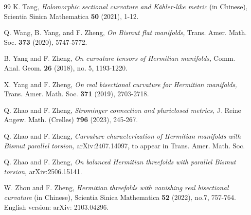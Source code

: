 \documentclass{amsart}
\begin{document}
\begin{thebibliography}{99}
  K. Tang, \emph{Holomorphic sectional curvature and K\"ahler-like metric} (in Chinese),  Scientia Sinica Mathematica {\bf 50} (2021), 1-12.




 Q. Wang, B. Yang, and F. Zheng, \emph{On Bismut flat manifolds,} Trans. Amer. Math. Soc. {\bf 373} (2020), 5747-5772.

 B. Yang and F. Zheng, \emph{On curvature tensors of Hermitian manifolds,} Comm. Anal. Geom. {\bf 26} (2018), no. 5, 1193-1220.


 X. Yang and F. Zheng, {\em On real bisectional curvature for Hermitian manifolds,} Trans. Amer. Math. Soc. {\bf 371} (2019),  2703-2718.



 Q. Zhao and F. Zheng, \emph{Strominger connection and pluriclosed metrics,}  J. Reine Angew. Math. (Crelles) {\bf 796} (2023),
245-267.



 Q. Zhao and F. Zheng, \emph{Curvature characterization of Hermitian manifolds with Bismut parallel torsion,} arXiv:2407.14097, to appear in Trans. Amer. Math. Soc.

 Q. Zhao and F. Zheng, \emph{On balanced Hermitian threefolds with parallel Bismut torsion,} arXiv:2506.15141.




  W. Zhou and F. Zheng, \emph{ Hermitian threefolds with vanishing real bisectional curvature} (in Chinese), Scientia Sinica Mathematica {\bf 52} (2022), no.7, 757-764. English version: arXiv: 2103.04296.

\end{thebibliography}
\end{document}
